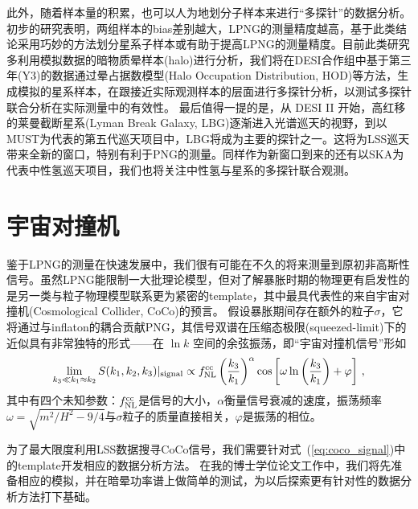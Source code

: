 此外，随着样本量的积累，也可以人为地划分子样本来进行“多探针”的数据分析。初步的研究表明，两组样本的bias差别越大，LPNG的测量精度越高\cite{barreira2023mtpng}，基于此类结论采用巧妙的方法划分星系子样本或有助于提高LPNG的测量精度。目前此类研究多利用模拟数据的暗物质晕样本(halo)进行分析，我们将在DESI合作组中基于第三年(Y3)的数据通过晕占据数模型(Halo Occupation Distribution, HOD)等方法，生成模拟的星系样本，在跟接近实际观测样本的层面进行多探针分析，以测试多探针联合分析在实际测量中的有效性。
最后值得一提的是，从 DESI II 开始，高红移的莱曼截断星系(Lyman Break Galaxy, LBG)逐渐进入光谱巡天的视野，到以MUST为代表的第五代巡天项目中，LBG将成为主要的探针之一。这将为LSS巡天带来全新的窗口，特别有利于PNG的测量。同样作为新窗口到来的还有以SKA为代表中性氢巡天项目，我们也将关注中性氢与星系的多探针联合观测。

\section{宇宙对撞机}

鉴于LPNG的测量在快速发展中，我们很有可能在不久的将来测量到原初非高斯性信号。虽然LPNG能限制一大批理论模型，但对了解暴胀时期的物理更有启发性的是另一类与粒子物理模型联系更为紧密的template，其中最具代表性的来自宇宙对撞机(Cosmological Collider, CoCo)的预言。
假设暴胀期间存在额外的粒子$\sigma$，它将通过与inflaton的耦合贡献PNG，其信号双谱在压缩态极限(squeezed-limit)下的近似具有非常独特的形式——在 $\ln k$ 空间的余弦振荡，即“宇宙对撞机信号”形如
\begin{equation}
    \lim_{k_3\ll k_1\approx k_2} S(k_1,k_2,k_3)|_{\rm signal} \propto f_{\rm NL}^{\rm cc} \left(\frac{k_3}{k_1}\right)^\alpha \cos\left[\omega \ln\left(\frac{k_3}{k_1}\right) + \varphi\right]\,, \label{eq:coco_signal}
\end{equation}
其中有四个未知参数：$f_{\rm NL}^{\rm cc}$是信号的大小，$\alpha$衡量信号衰减的速度，振荡频率$\omega=\sqrt{m^2/H^2-9/4}$与$\sigma$粒子的质量直接相关，$\varphi$是振荡的相位。

为了最大限度利用LSS数据搜寻CoCo信号，我们需要针对式~(\ref{eq:coco_signal})中的template开发相应的数据分析方法。
在我的博士学位论文工作中，我们将先准备相应的模拟，并在暗晕功率谱上做简单的测试，为以后探索更有针对性的数据分析方法打下基础。


